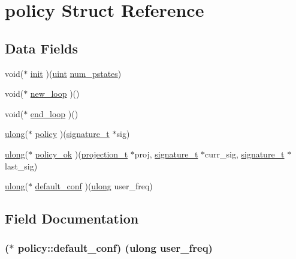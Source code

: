 \hypertarget{structpolicy}{}\section{policy Struct Reference}
\label{structpolicy}
\subsection*{Data Fields}
\begin{DoxyCompactItemize}
\item 
void($\ast$ \hyperlink{structpolicy_ade5ad6f0239e34d13826497fd72d917e}{init} )(\hyperlink{generic_8h_a91ad9478d81a7aaf2593e8d9c3d06a14}{uint} \hyperlink{coeffs__show_8c_abda44c9fa99beca77378f1e2b24aff31}{num\+\_\+pstates})
\item 
void($\ast$ \hyperlink{structpolicy_a9bb8e49f1796876238623460ff349ebf}{new\+\_\+loop} )()
\item 
void($\ast$ \hyperlink{structpolicy_a2e7ced29d27efca9a3d90ffc8fe0226e}{end\+\_\+loop} )()
\item 
\hyperlink{generic_8h_a718b4eb2652c286f4d42dc18a8e71a1a}{ulong}($\ast$ \hyperlink{structpolicy_a9c08472eff148dd22c31f1b733dfed60}{policy} )(\hyperlink{signature_8h_a3387c90f9aa9243c926866ee8ce61917}{signature\+\_\+t} $\ast$sig)
\item 
\hyperlink{generic_8h_a718b4eb2652c286f4d42dc18a8e71a1a}{ulong}($\ast$ \hyperlink{structpolicy_a5be97c21f646a597063e280cbcaec128}{policy\+\_\+ok} )(\hyperlink{projection_8h_a50fc11780fbb9af29b37d325d803a2da}{projection\+\_\+t} $\ast$proj, \hyperlink{signature_8h_a3387c90f9aa9243c926866ee8ce61917}{signature\+\_\+t} $\ast$curr\+\_\+sig, \hyperlink{signature_8h_a3387c90f9aa9243c926866ee8ce61917}{signature\+\_\+t} $\ast$last\+\_\+sig)
\item 
\hyperlink{generic_8h_a718b4eb2652c286f4d42dc18a8e71a1a}{ulong}($\ast$ \hyperlink{structpolicy_a647e41f22ae624084b0082721c013400}{default\+\_\+conf} )(\hyperlink{generic_8h_a718b4eb2652c286f4d42dc18a8e71a1a}{ulong} user\+\_\+freq)
\end{DoxyCompactItemize}


\subsection{Field Documentation}
\subsubsection[{\texorpdfstring{default\+\_\+conf}{default_conf}}]{($\ast$ policy\+::default\+\_\+conf) ({\bf ulong} user\+\_\+freq)}\hypertarget{structpolicy_a647e41f22ae624084b0082721c013400}{}\label{structpolicy_a647e41f22ae624084b0082721c013400}
